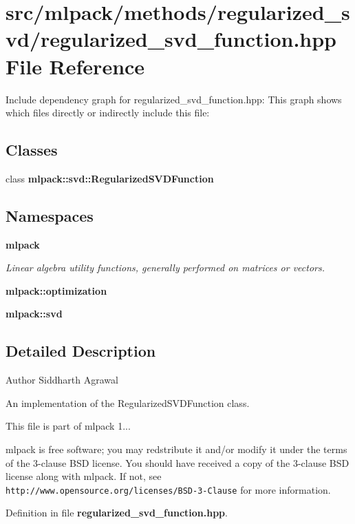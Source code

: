 \section{src/mlpack/methods/regularized\-\_\-svd/regularized\-\_\-svd\-\_\-function.hpp File Reference}
\label{regularized__svd__function_8hpp}
Include dependency graph for regularized\-\_\-svd\-\_\-function.\-hpp\-:
This graph shows which files directly or indirectly include this file\-:
\subsection*{Classes}
\begin{DoxyCompactItemize}
\item 
class {\bf mlpack\-::svd\-::\-Regularized\-S\-V\-D\-Function}
\end{DoxyCompactItemize}
\subsection*{Namespaces}
\begin{DoxyCompactItemize}
\item 
{\bf mlpack}
\begin{DoxyCompactList}\small\item\em Linear algebra utility functions, generally performed on matrices or vectors. \end{DoxyCompactList}\item 
{\bf mlpack\-::optimization}
\item 
{\bf mlpack\-::svd}
\end{DoxyCompactItemize}


\subsection{Detailed Description}
\begin{DoxyAuthor}{Author}
Siddharth Agrawal
\end{DoxyAuthor}
An implementation of the Regularized\-S\-V\-D\-Function class.

This file is part of mlpack 1...

mlpack is free software; you may redstribute it and/or modify it under the terms of the 3-\/clause B\-S\-D license. You should have received a copy of the 3-\/clause B\-S\-D license along with mlpack. If not, see {\tt http\-://www.\-opensource.\-org/licenses/\-B\-S\-D-\/3-\/\-Clause} for more information. 

Definition in file {\bf regularized\-\_\-svd\-\_\-function.\-hpp}.

